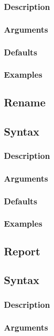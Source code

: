 \documentclass[11pt]{article}
\begin{document}
\begin{itemize}
		\subsubsection{Description}
		\subsubsection{Arguments}
		\subsubsection{Defaults}
		\subsubsection{Examples}
	
	\subsection{Rename}
		\subsection{Syntax}
		\subsubsection{Description}
		\subsubsection{Arguments}
		\subsubsection{Defaults}
		\subsubsection{Examples}
	
	\subsection{Report}
		\subsection{Syntax}
		\subsubsection{Description}
		\subsubsection{Arguments}

\end{itemize}
\end{document}
